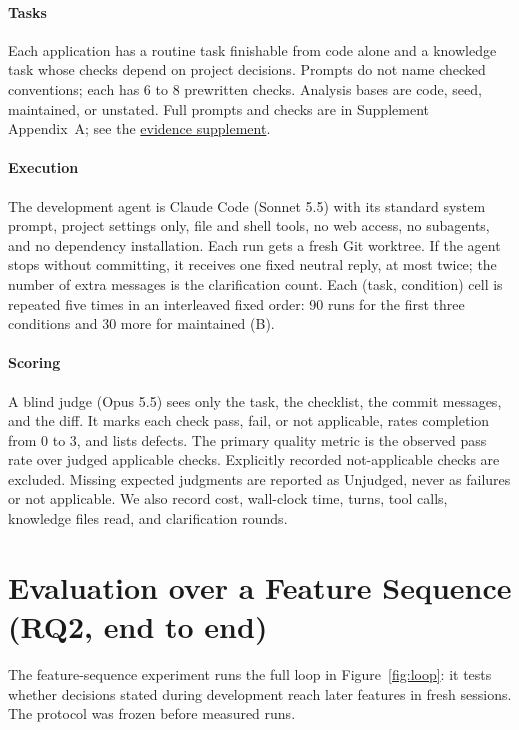 \paragraph{Tasks} Each application has a routine task finishable from code alone and a knowledge task whose checks depend on project decisions. Prompts do not name checked conventions; each has 6 to 8 prewritten checks. Analysis bases are code, seed, maintained, or unstated. Full prompts and checks are in Supplement Appendix~A; see the \href{context-ops-supplement.pdf}{evidence supplement}.

\paragraph{Execution} The development agent is Claude Code (Sonnet 5.5) with its standard system prompt, project settings only, file and shell tools, no web access, no subagents, and no dependency installation. Each run gets a fresh Git worktree. If the agent stops without committing, it receives one fixed neutral reply, at most twice; the number of extra messages is the clarification count. Each (task, condition) cell is repeated five times in an interleaved fixed order: 90 runs for the first three conditions and 30 more for maintained (B).

\paragraph{Scoring} A blind judge (Opus 5.5) sees only the task, the checklist, the commit messages, and the diff. It marks each check pass, fail, or not applicable, rates completion from 0 to 3, and lists defects. The primary quality metric is the observed pass rate over judged applicable checks. Explicitly recorded not-applicable checks are excluded. Missing expected judgments are reported as Unjudged, never as failures or not applicable. We also record cost, wall-clock time, turns, tool calls, knowledge files read, and clarification rounds.

\section{Evaluation over a Feature Sequence (RQ2, end to end)}
\label{sec:loop-method}

The feature-sequence experiment runs the full loop in Figure~\ref{fig:loop}: it tests whether decisions stated during development reach later features in fresh sessions. The protocol was frozen before measured runs.

